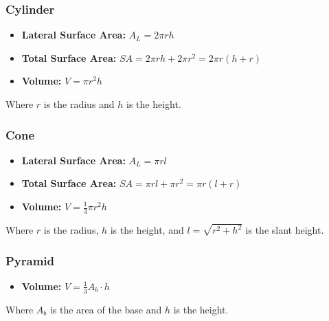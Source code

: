 \subsubsection{Cylinder}
\begin{itemize}
    \item \textbf{Lateral Surface Area:} $A_L = 2\pi rh$
    \item \textbf{Total Surface Area:} $SA = 2\pi rh + 2\pi r^2 = 2\pi r(h+r)$
    \item \textbf{Volume:} $V = \pi r^2 h$
\end{itemize}
Where $r$ is the radius and $h$ is the height.

\subsubsection{Cone}
\begin{itemize}
    \item \textbf{Lateral Surface Area:} $A_L = \pi r l$
    \item \textbf{Total Surface Area:} $SA = \pi r l + \pi r^2 = \pi r(l+r)$
    \item \textbf{Volume:} $V = \frac{1}{3}\pi r^2 h$
\end{itemize}
Where $r$ is the radius, $h$ is the height, and $l = \sqrt{r^2+h^2}$ is the slant height.

\subsubsection{Pyramid}
\begin{itemize}
    \item \textbf{Volume:} $V = \frac{1}{3} A_b \cdot h$
\end{itemize}
Where $A_b$ is the area of the base and $h$ is the height.